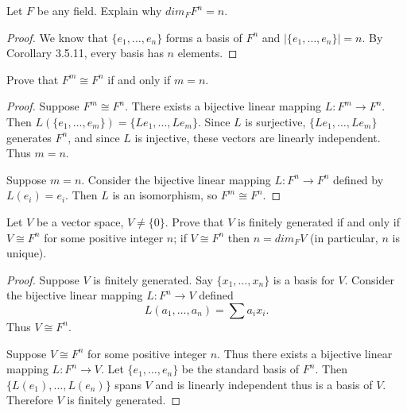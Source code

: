 \begin{tcolorbox}[title=Problem 2, breakable]
    Let $F$ be any field.
    Explain why $dim_F F^n = n$.
\end{tcolorbox}

\begin{proof}
    We know that $\{e_1, \ldots, e_n\}$ forms a basis of $F^n$ and $|\{e_1, \ldots, e_n\}| = n$.
    By Corollary 3.5.11, every basis has $n$ elements.
\end{proof}

\begin{tcolorbox}[title=Problem 3, breakable]
    Prove that $F^m \cong F^n$
    if and only if $m = n$.
\end{tcolorbox}

\begin{proof}
    \underbar{\textbf{($\longrightarrow$)}}
    Suppose $F^m \cong F^n$.
    There exists a bijective linear mapping $L : F^m \longrightarrow F^n$.
    Then $L(\{e_1, \ldots, e_m\}) = \{L e_1, \ldots, L e_m\}$.
    Since $L$ is surjective, $\{L e_1, \ldots, L e_m\}$ generates $F^n$, and since $L$ is injective, these vectors are linearly independent.
    Thus $m = n$.

    \underbar{\textbf{($\longleftarrow$)}}
    Suppose $m = n$.
    Consider the bijective linear mapping $L : F^n \longrightarrow F^n$ defined by $L(e_i) = e_i$.
    Then $L$ is an isomorphism, so $F^m \cong F^n$.
\end{proof}

\begin{tcolorbox}[title=Problem 4, breakable]
    Let $V$ be a vector space, $V \ne \{0\}$.
    Prove that $V$ is finitely generated if 
    and only if $V \cong F^n$ for some 
    positive integer $n$; if $V \cong F^n$
    then $n = dim_F V$ (in particular, $n$ is unique).
\end{tcolorbox}

\begin{proof}
    \underbar{\textbf{($\longrightarrow$)}}
    Suppose $V$ is finitely generated.
    Say $\{x_1, \ldots, x_n\}$ is a basis for $V$.
    Consider the bijective linear mapping $L: F^n \longrightarrow V$ defined 
    \[L(a_1, \ldots, a_n) = \sum a_i x_i.\]
    Thus $V \cong F^n$.

    \underbar{\textbf{($\longleftarrow$)}}
    Suppose $V \cong F^n$ for some positive integer $n$.
    Thus there exists a bijective linear mapping $L: F^n \longrightarrow V$.
    Let $\{e_1, \ldots, e_n\}$ be the standard basis of $F^n$.
    Then $\{L(e_1), \ldots, L(e_n)\}$ spans $V$ and is linearly independent thus is a basis of $V$.
    Therefore $V$ is finitely generated.
\end{proof}

